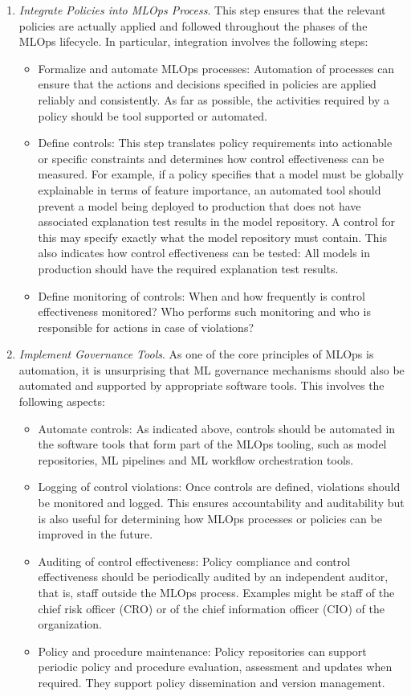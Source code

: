 \begin{enumerate}
\item \emph{Integrate Policies into MLOps Process}. This step ensures that the relevant policies are actually applied and followed throughout the phases of the MLOps lifecycle. In particular, integration involves the following steps:
\begin{itemize}
   \item Formalize and automate MLOps processes: Automation of processes can ensure that the actions and decisions specified in policies are applied reliably and consistently. As far as possible, the activities required by a policy should be tool supported or automated. 
   \item Define controls: This step translates policy requirements into actionable or specific constraints and determines how control effectiveness can be measured. For example, if a policy specifies that a model must be globally explainable in terms of feature importance, an automated tool should prevent a model being deployed to production that does not have associated explanation test results in the model repository. A control for this may specify exactly what the model repository must contain. This also indicates how control effectiveness can be tested: All models in production should have the required explanation test results. 
   \item Define monitoring of controls: When and how frequently is control effectiveness monitored? Who performs such monitoring and who is responsible for actions in case of violations?
\end{itemize}

\item \emph{Implement Governance Tools}. As one of the core principles of MLOps is automation, it is unsurprising that ML governance mechanisms should also be automated and supported by appropriate software tools. This involves the following aspects:
\begin{itemize}
   \item Automate controls: As indicated above, controls should be automated in the software tools that form part of the MLOps tooling, such as model repositories, ML pipelines and ML workflow orchestration tools. 
   \item Logging of control violations: Once controls are defined, violations should be monitored and logged. This ensures accountability and auditability but is also useful for determining how MLOps processes or policies can be improved in the future. 
   \item Auditing of control effectiveness: Policy compliance and control effectiveness should be periodically audited by an independent auditor, that is, staff outside the MLOps process. Examples might be staff of the chief risk officer (CRO) or of the chief information officer (CIO) of the organization. 
   \item Policy and procedure maintenance: Policy repositories can support periodic policy and procedure evaluation, assessment and updates when required. They support policy dissemination and version management. 
\end{itemize}


\end{enumerate}
